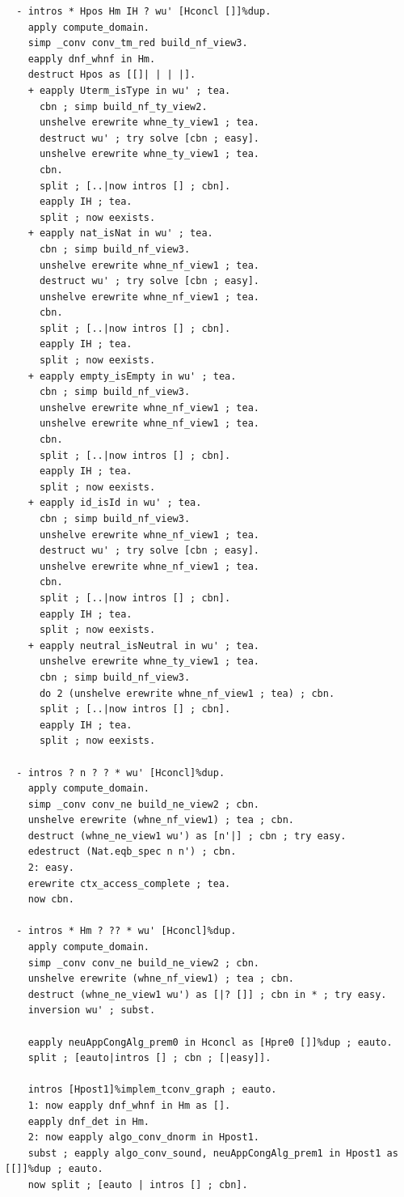 \documentclass[10pt,a4paper]{amsart}
\begin{document}
\begin{lstlisting}
  - intros * Hpos Hm IH ? wu' [Hconcl []]%dup. 
    apply compute_domain.
    simp _conv conv_tm_red build_nf_view3.
    eapply dnf_whnf in Hm.
    destruct Hpos as [[]| | | |].
    + eapply Uterm_isType in wu' ; tea.
      cbn ; simp build_nf_ty_view2.
      unshelve erewrite whne_ty_view1 ; tea.
      destruct wu' ; try solve [cbn ; easy].
      unshelve erewrite whne_ty_view1 ; tea.
      cbn.
      split ; [..|now intros [] ; cbn].
      eapply IH ; tea.
      split ; now eexists.
    + eapply nat_isNat in wu' ; tea.
      cbn ; simp build_nf_view3.
      unshelve erewrite whne_nf_view1 ; tea.
      destruct wu' ; try solve [cbn ; easy].
      unshelve erewrite whne_nf_view1 ; tea.
      cbn.
      split ; [..|now intros [] ; cbn].
      eapply IH ; tea.
      split ; now eexists.
    + eapply empty_isEmpty in wu' ; tea.
      cbn ; simp build_nf_view3.
      unshelve erewrite whne_nf_view1 ; tea.
      unshelve erewrite whne_nf_view1 ; tea.
      cbn.
      split ; [..|now intros [] ; cbn].
      eapply IH ; tea.
      split ; now eexists.
    + eapply id_isId in wu' ; tea.
      cbn ; simp build_nf_view3.
      unshelve erewrite whne_nf_view1 ; tea.
      destruct wu' ; try solve [cbn ; easy].
      unshelve erewrite whne_nf_view1 ; tea.
      cbn.
      split ; [..|now intros [] ; cbn].
      eapply IH ; tea.
      split ; now eexists.
    + eapply neutral_isNeutral in wu' ; tea.
      unshelve erewrite whne_ty_view1 ; tea.
      cbn ; simp build_nf_view3.
      do 2 (unshelve erewrite whne_nf_view1 ; tea) ; cbn.
      split ; [..|now intros [] ; cbn].
      eapply IH ; tea.
      split ; now eexists.
  
  - intros ? n ? ? * wu' [Hconcl]%dup.
    apply compute_domain.
    simp _conv conv_ne build_ne_view2 ; cbn.
    unshelve erewrite (whne_nf_view1) ; tea ; cbn.
    destruct (whne_ne_view1 wu') as [n'|] ; cbn ; try easy.
    edestruct (Nat.eqb_spec n n') ; cbn.
    2: easy.
    erewrite ctx_access_complete ; tea.
    now cbn.

  - intros * Hm ? ?? * wu' [Hconcl]%dup.
    apply compute_domain.
    simp _conv conv_ne build_ne_view2 ; cbn.
    unshelve erewrite (whne_nf_view1) ; tea ; cbn.
    destruct (whne_ne_view1 wu') as [|? []] ; cbn in * ; try easy.
    inversion wu' ; subst.

    eapply neuAppCongAlg_prem0 in Hconcl as [Hpre0 []]%dup ; eauto.
    split ; [eauto|intros [] ; cbn ; [|easy]].

    intros [Hpost1]%implem_tconv_graph ; eauto.
    1: now eapply dnf_whnf in Hm as [].
    eapply dnf_det in Hm.
    2: now eapply algo_conv_dnorm in Hpost1.
    subst ; eapply algo_conv_sound, neuAppCongAlg_prem1 in Hpost1 as [[]]%dup ; eauto.
    now split ; [eauto | intros [] ; cbn].


\end{lstlisting}
\end{document}
